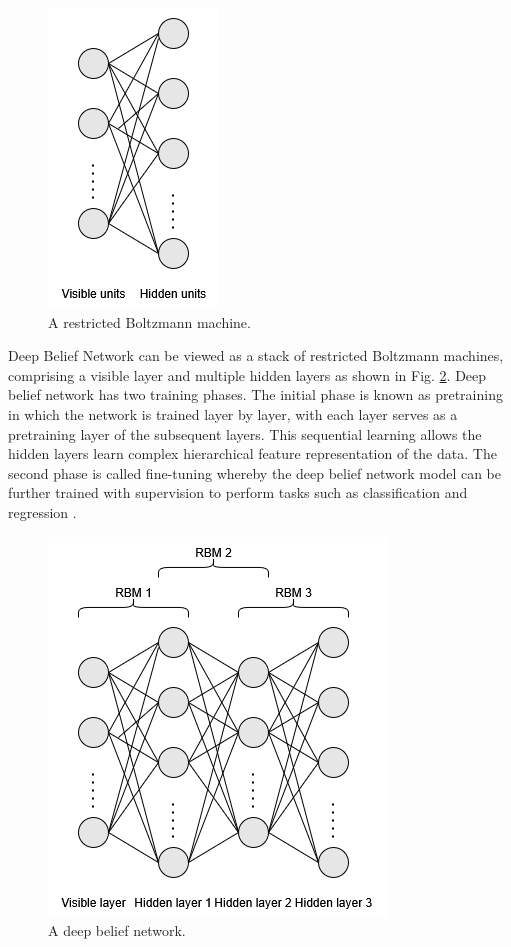 \documentclass[preprint,12pt]{elsarticle}
\begin{document}
\begin{figure}[h!]
    \centering
    \includegraphics[scale=0.6]{fig_deep_unsv_learning_rbm.png}
    \caption{A restricted Boltzmann machine.}
    \label{fig_deep_unsv_learning_rbm}
\end{figure}

Deep Belief Network can be viewed as a stack of restricted Boltzmann machines, comprising a visible layer and multiple hidden layers \citep{hinton_fast_2006} as shown in Fig. \ref{fig_deep_unsv_learning_dbn}. Deep belief network has two training phases. The initial phase is known as pretraining in which the network is trained layer by layer, with each layer serves as a pretraining layer of the subsequent layers. This sequential learning allows the hidden layers learn complex hierarchical feature representation of the data. The second phase is called fine-tuning whereby the deep belief network model can be further trained with supervision to perform tasks such as classification and regression \citep{hinton_deep_2009}.

\begin{figure}[h!]
    \centering
    \includegraphics[scale=0.6]{fig_deep_unsv_learning_dbn.png}
    \caption{A deep belief network.}
    \label{fig_deep_unsv_learning_dbn}
\end{figure}
\end{document}
